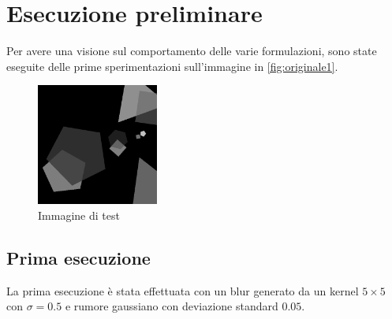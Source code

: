 \documentclass[11pt]{article}
\begin{document}
\newpage
\section{Esecuzione preliminare}
\label{chap:lambda}
Per avere una visione sul comportamento delle varie formulazioni, sono state eseguite delle prime sperimentazioni sull'immagine in \autoref{fig:originale1}.
\begin{figure}[H]
    \centering
    \includegraphics[width=4cm]{esecuzione/originale.png}
    \caption{Immagine di test}
    \label{fig:originale1}
\end{figure}

\subsection{Prima esecuzione}
La prima esecuzione è stata effettuata con un blur generato da un kernel $5 \times 5$ con $\sigma=0.5$ e rumore gaussiano con deviazione standard $0.05$.
\end{document}
